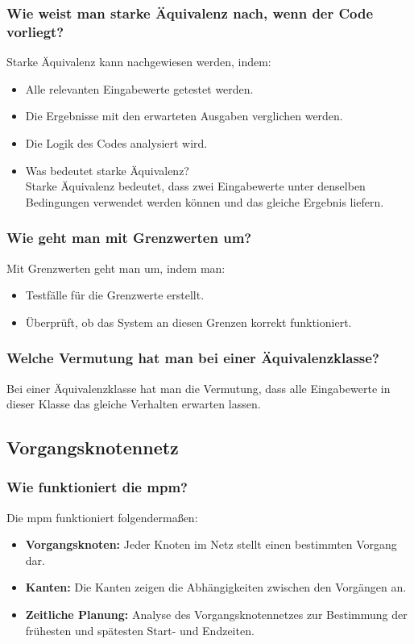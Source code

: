 \documentclass[main.tex]{subfiles}
\begin{document}
\subsubsection*{Wie weist man starke Äquivalenz nach, wenn der Code vorliegt?}
Starke Äquivalenz kann nachgewiesen werden, indem:
\begin{itemize}
    \item Alle relevanten Eingabewerte getestet werden.
    \item Die Ergebnisse mit den erwarteten Ausgaben verglichen werden.
    \item Die Logik des Codes analysiert wird.
\end{itemize}
\begin{itemize}
    \item Was bedeutet starke Äquivalenz? \\
    Starke Äquivalenz bedeutet, dass zwei Eingabewerte unter denselben Bedingungen verwendet werden können und das gleiche Ergebnis liefern.
\end{itemize}


\subsubsection*{Wie geht man mit Grenzwerten um?}
Mit Grenzwerten geht man um, indem man:
\begin{itemize}
    \item Testfälle für die Grenzwerte erstellt.
    \item Überprüft, ob das System an diesen Grenzen korrekt funktioniert.
\end{itemize}



\subsubsection*{Welche Vermutung hat man bei einer Äquivalenzklasse?}
Bei einer \gls{Äquivalenzklasse} hat man die Vermutung, dass alle Eingabewerte in dieser Klasse das gleiche Verhalten erwarten lassen.


\subsection{Vorgangsknotennetz}
\subsubsection*{Wie funktioniert die \gls{mpm}?}
Die \gls{mpm} funktioniert folgendermaßen:
\begin{itemize}
    \item \textbf{Vorgangsknoten:} Jeder Knoten im Netz stellt einen bestimmten Vorgang dar.
    \item \textbf{Kanten:} Die Kanten zeigen die Abhängigkeiten zwischen den Vorgängen an.
    \item \textbf{Zeitliche Planung:} Analyse des Vorgangsknotennetzes zur Bestimmung der frühesten und spätesten Start- und Endzeiten.
\end{itemize}
\end{document}
